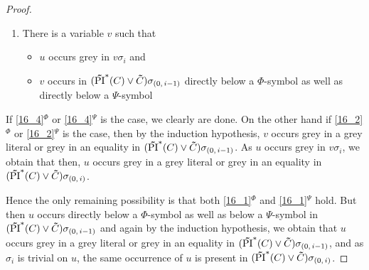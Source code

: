 \documentclass[%
	draft=false,%
	numbers=noendperiod,%
	11pt,%
	a4paper,%
	oneside,%
	openany,%
]{memoir}
\begin{document}
\begin{proof}
\begin{enumerate}
		\item 
			\label{16_2}
			There is a variable $v$ such that 
			{
				\renewcommand{\labelitemi}{\textendash}
				\begin{itemize}
					\item $u$ occurs grey in $v\sigma_i$ and
					\item $v$ occurs in $(\bm\tilde{\operatorname{PI}}^{*}(C)\lor \bm\tilde{C})\sigma_{(0,\,i-1)}$ directly below a $\Phi$-symbol as well as directly below a $\Psi$-symbol
				\end{itemize}
			}
	\end{enumerate}

	If \ref{16_4}$^\Phi$ or \ref{16_4}$^\Psi$ is the case, we clearly are done.
	On the other hand if \ref{16_2}$^\Phi$ or \ref{16_2}$^\Psi$ is the case, then by the induction hypothesis, $v$ occurs grey in a grey literal or grey in an equality in $(\bm\tilde{\operatorname{PI}}^{*}(C)\lor \bm\tilde{C})\sigma_{(0,\,i-1)}$. 
	As $u$ occurs grey in $v\sigma_i$, we obtain that then, $u$ occurs grey in a grey literal or grey in an equality in $(\bm\tilde{\operatorname{PI}}^{*}(C)\lor \bm\tilde{C})\sigma_{(0,\,i)}$.

	Hence the only remaining possibility is that both \ref{16_1}$^\Phi$
	and \ref{16_1}$^\Psi$ hold.
	But then $u$ occurs directly below a $\Phi$-symbol as well as below a $\Psi$-symbol in $(\bm\tilde{\operatorname{PI}}^{*}(C)\lor \bm\tilde{C})\sigma_{(0,\,i-1)}$ and again by the induction hypothesis, we obtain that $u$ occurs grey in a grey literal or grey in an equality in $(\bm\tilde{\operatorname{PI}}^{*}(C)\lor \bm\tilde{C})\sigma_{(0,\,i-1)}$, and as $\sigma_i$ is trivial on $u$, the same occurrence of $u$ is present in $(\bm\tilde{\operatorname{PI}}^{*}(C)\lor \bm\tilde{C})\sigma_{(0,\,i)}$.
\end{proof}
\end{document}
